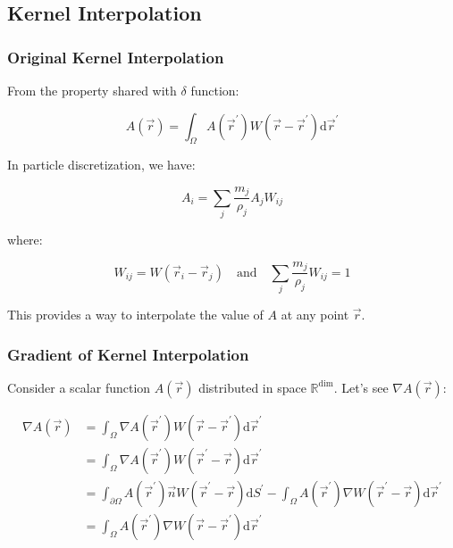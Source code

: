 \documentclass[10pt, oneside]{article}
\begin{document}
\subsection{Kernel Interpolation}

\subsubsection{Original Kernel Interpolation}

From the property shared with $\delta$ function:

\begin{equation}
    A(\vec{r}) = 
    \int_{\Omega} A(\vec{r}^\prime) 
    W(\vec{r} - \vec{r}^\prime) \mathrm{d}\vec{r}^\prime
\end{equation}

In particle discretization, we have:

\begin{equation}
    A_i = \sum_{j} \frac{m_j}{\rho_j} A_j W_{ij}
\end{equation}

where:

\begin{equation}
    W_{ij} = W(\vec{r}_i - \vec{r}_j)\quad \text{and} 
    \quad \sum_{j} \frac{m_j}{\rho_j} W_{ij} = 1
\end{equation}

This provides a way to interpolate the value of $A$ at any point $\vec{r}$.

\subsubsection{Gradient of Kernel Interpolation}

Consider a scalar function $A(\vec{r})$ distributed in space $\mathbb{R}^\text{dim}$. 
Let's see $\nabla A(\vec{r})$:

\begin{equation}
    \begin{aligned}
        \nabla A(\vec{r}) 
        &= \int_{\Omega} \nabla A(\vec{r}^\prime) W(\vec{r} - \vec{r}^\prime) \mathrm{d}\vec{r}^\prime \\
        &= \int_{\Omega} \nabla A(\vec{r}^\prime) W(\vec{r}^\prime - \vec{r}) \mathrm{d}\vec{r}^\prime \\
        &= \int_{\partial \Omega} A(\vec{r}^\prime) \vec{n} W(\vec{r}^\prime - \vec{r}) \mathrm{d}S^\prime
        -\int_{\Omega} A(\vec{r}^\prime) \nabla W(\vec{r}^\prime - \vec{r}) \mathrm{d}\vec{r}^\prime\\
        &= \int_{\Omega} A(\vec{r}^\prime) \nabla W(\vec{r} - \vec{r}^\prime) \mathrm{d}\vec{r}^\prime
    \end{aligned}
\end{equation}
\end{document}
